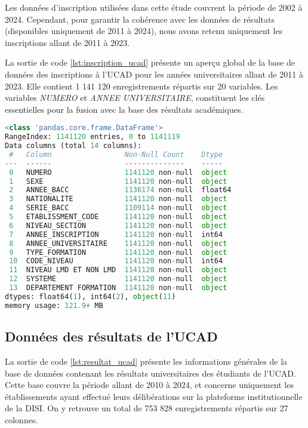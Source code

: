 Les données d’inscription utilisées dans cette étude couvrent la période de 2002 à 2024. 
Cependant, pour garantir la cohérence avec les données de résultats (disponibles uniquement de 2011 à 2024), 
nous avons retenu uniquement les inscriptions allant de 2011 à 2023.

La sortie de code \ref{lst:inscription_ucad} présente un aperçu global de la base de données des inscriptions à l’UCAD pour les années universitaires allant de 2011 à 2023. 
Elle contient 1 141 120 enregistrements répartis sur 20 variables. Les variables \textit{NUMERO} et \textit{ANNEE UNIVERSITAIRE}, 
constituent les clés essentielles pour la fusion avec la base des résultats académiques.


\begin{lstlisting}[language=Python,
    caption=Info global du data des inscriptions, 
    label=lst:inscription_ucad, 
    basicstyle=\ttfamily\footnotesize, 
    backgroundcolor=\color{gray!10}
]
<class 'pandas.core.frame.DataFrame'>
RangeIndex: 1141120 entries, 0 to 1141119
Data columns (total 14 columns):
 #   Column                 Non-Null Count    Dtype  
---  ------                 --------------    -----  
 0   NUMERO                 1141120 non-null  object 
 1   SEXE                   1141120 non-null  object 
 2   ANNEE_BACC             1136174 non-null  float64
 3   NATIONALITE            1141120 non-null  object 
 4   SERIE_BACC             1109114 non-null  object 
 5   ETABLISSMENT_CODE      1141120 non-null  object 
 6   NIVEAU_SECTION         1141120 non-null  object 
 7   ANNEE_INSCRIPTION      1141120 non-null  int64  
 8   ANNEE_UNIVERSITAIRE    1141120 non-null  object 
 9   TYPE_FORMATION         1141120 non-null  object 
 10  CODE_NIVEAU            1141120 non-null  int64  
 11  NIVEAU LMD ET NON LMD  1141120 non-null  object 
 12  SYSTEME                1141120 non-null  object 
 13  DEPARTEMENT FORMATION  1141120 non-null  object 
dtypes: float64(1), int64(2), object(11)
memory usage: 121.9+ MB
\end{lstlisting}

\newpage
\subsection{Données des résultats de l’UCAD}

La sortie de code \ref{lst:resultat_ucad} présente les informations générales de la base de données contenant les résultats universitaires des étudiants de l’UCAD. 
Cette base couvre la période allant de 2010 à 2024, et concerne uniquement les établissements ayant effectué leurs délibérations sur la plateforme institutionnelle de la DISI. 
On y retrouve un total de 753 828 enregistrements répartis sur 27 colonnes.

